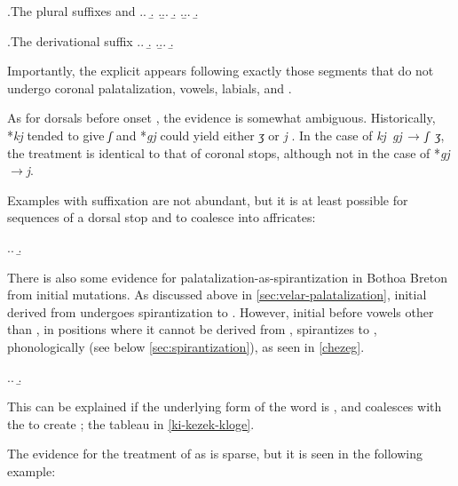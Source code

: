 \ex.\label{ex:broiou-feurmiou}The plural suffixes  and 
\a.\a.
\b.
\z.\b.\a.
\b.
\z.\b.\a.
\b.

\ex.\label{ex:otoiad-keriad}The derivational suffix 
\a.\a.
\b.
\z.\b.\a.
\b.

Importantly, the explicit \ipa{[j]} appears following exactly those segments that do not undergo coronal palatalization, \ie vowels, labials, and \ipa{[r]}.

As for dorsals before onset \ipa{[i]}, the evidence is somewhat ambiguous. Historically, *\emph{kj} tended to give \emph{ʃ} and *\emph{gj} could yield either \emph{ʒ} or \emph{j} \citep[§585]{histbreton}. In the case of \emph{kj~gj}\,$\rightarrow$\,\emph{ʃ~ʒ}, the treatment is identical to that of coronal stops, although not in the case of *\emph{gj}\,$\rightarrow$\emph{j}.

Examples with suffixation are not abundant, but it is at least possible for sequences of a dorsal stop and \ipa{[j]} to coalesce into affricates:

\ex.\label{elastique}\a.
\b.

There is also some evidence for palatalization\hyp as\hyp spirantization in Bothoa Breton from initial mutations. As discussed above in \cref{sec:velar-palatalization}, initial \ipa{[ʧ]} derived from \ipa{[k]} undergoes spirantization to \ipa{[h]}. However, initial \ipa{[ʧ]} before vowels other than \ipa{[i~y]}, \ie in positions where it cannot be derived from , spirantizes to , phonologically \ipa{[hj]} (see below \cref{sec:spirantization}), as seen in \cref{chezeg}.

\ex.\label{chezeg}\a.
\b.

This can be explained if the underlying form of the word is , and \ipa{[k]} coalesces with the \ipa{[i]} to create \ipa{[ʧ]}; \cf the tableau in \ref{ki-kezek-kloge}.

The evidence for the treatment of  as \ipa{[j]} is sparse, but it is seen in the following example:

